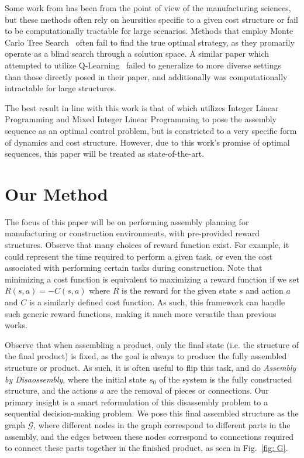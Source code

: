 \documentclass{article}
\begin{document}
Some work from has been from the point of view of the manufacturing sciences, but these methods often rely on heursitics specific to a given cost structure or fail to be computationally tractable for large scenarios. Methods that employ Monte Carlo Tree Search~\citep{Giorgio2018a} often fail to find the true optimal strategy, as they promarily operate as a blind search through a solution space. A similar paper which attempted to utilize Q-Learning~\citep{Giorgio2018} failed to generalize to more diverse settings than those directly posed in their paper, and additionally was computationally intractable for large structures.

The best result in line with this work is that of \citep{Culbertson2019} which utilizes Integer Linear Programming and Mixed Integer Linear Programming to pose the assembly sequence as an optimal control problem, but is constricted to a very specific form of dynamics and cost structure. However, due to this work's promise of optimal sequences, this paper will be treated as state-of-the-art.



\section{Our Method}
The focus of this paper will be on performing assembly planning for manufacturing or construction environments, with pre-provided reward structures. Observe that many choices of reward function exist. For example, it could represent the time required to perform a given task, or even the cost associated with performing certain tasks during construction. Note that minimizing a cost function is equivalent to maximizing a reward function if we set $R(s,a) = -C(s,a)$ where $R$ is the reward for the given state $s$ and action $a$ and $C$ is a similarly defined cost function. As such, this framework can handle such generic reward functions, making it much more versatile than previous works.

Observe that when assembling a product, only the final state (i.e. the structure of the final product) is fixed, as the goal is always to produce the fully assembled structure or product. As such, it is often useful to flip this task, and do \emph{Assembly by Disaossembly}, where the initial state $s_0$ of the system is the fully constructed structure, and the actions $a$ are the removal of pieces or connections. Our primary insight is a smart reformulation of this disassembly problem to a sequential decision-making problem. We pose this final assembled structure as the graph $\mathcal{G}$, where different nodes in the graph correspond to different parts in the assembly, and the edges between these nodes correspond to connections required to connect these parts together in the finished product, as seen in Fig.~\ref{fig: G}.
\end{document}
